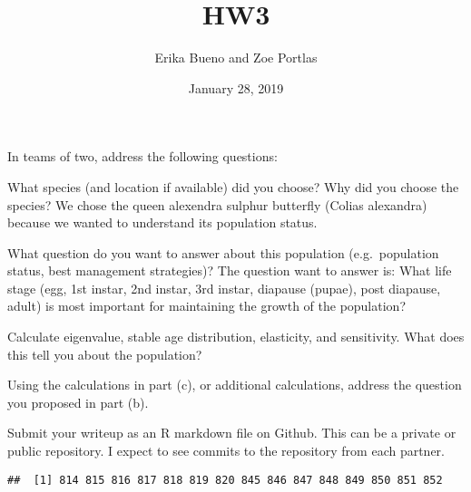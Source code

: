 \documentclass[]{article}
\title{HW3}
\author{Erika Bueno and Zoe Portlas}
\date{January 28, 2019}
\newenvironment{Shaded}{\begin{snugshade}}{\end{snugshade}}
\newcommand{\KeywordTok}[1]{\textcolor[rgb]{0.13,0.29,0.53}{\textbf{#1}}}
\newcommand{\DataTypeTok}[1]{\textcolor[rgb]{0.13,0.29,0.53}{#1}}
\newcommand{\DecValTok}[1]{\textcolor[rgb]{0.00,0.00,0.81}{#1}}
\newcommand{\StringTok}[1]{\textcolor[rgb]{0.31,0.60,0.02}{#1}}
\newcommand{\CommentTok}[1]{\textcolor[rgb]{0.56,0.35,0.01}{\textit{#1}}}
\newcommand{\OperatorTok}[1]{\textcolor[rgb]{0.81,0.36,0.00}{\textbf{#1}}}
\newcommand{\NormalTok}[1]{#1}
\begin{document}
\maketitle

In teams of two, address the following questions:

What species (and location if available) did you choose? Why did you
choose the species? We chose the queen alexendra sulphur butterfly
(Colias alexandra) because we wanted to understand its population
status.

What question do you want to answer about this population
(e.g.~population status, best management strategies)? The question want
to answer is: What life stage (egg, 1st instar, 2nd instar, 3rd instar,
diapause (pupae), post diapause, adult) is most important for
maintaining the growth of the population?

Calculate eigenvalue, stable age distribution, elasticity, and
sensitivity. What does this tell you about the population?

Using the calculations in part (c), or additional calculations, address
the question you proposed in part (b).

Submit your writeup as an R markdown file on Github. This can be a
private or public repository. I expect to see commits to the repository
from each partner.

\begin{Shaded}
\end{Shaded}

\begin{verbatim}
##  [1] 814 815 816 817 818 819 820 845 846 847 848 849 850 851 852
\end{verbatim}

\begin{Shaded}
\end{Shaded}
\end{document}
